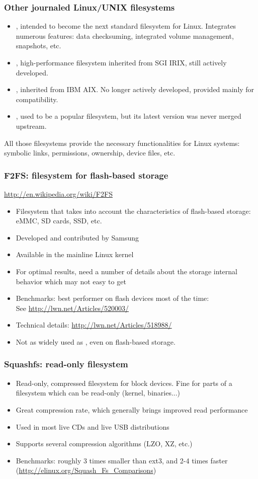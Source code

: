 \begin{frame}
  \frametitle{Other journaled Linux/UNIX filesystems}
  \begin{itemize}
  \item {}, intended to become the next standard filesystem
    for Linux. Integrates numerous features: data checksuming,
    integrated volume management, snapshots, etc.
  \item {}, high-performance filesystem inherited from SGI
    IRIX, still actively developed.
  \item {}, inherited from IBM AIX. No longer actively
    developed, provided mainly for compatibility.
  \item {}, used to be a popular filesystem, but its
    latest version  was never merged upstream.
  \end{itemize}
  All those filesystems provide the necessary functionalities for
  Linux systems: symbolic links, permissions, ownership, device files,
  etc.
\end{frame}

\begin{frame}
  \frametitle{F2FS: filesystem for flash-based storage}
  \url{http://en.wikipedia.org/wiki/F2FS}
  \begin{itemize}
  \item Filesystem that takes into account the characteristics of
    flash-based storage: eMMC, SD cards, SSD, etc.
  \item Developed and contributed by Samsung
  \item Available in the mainline Linux kernel
  \item For optimal results, need a number of details about the
    storage internal behavior which may not easy to get
  \item Benchmarks: best performer on flash devices most of the time: \\
        See \url{http://lwn.net/Articles/520003/}
  \item Technical details: \url{http://lwn.net/Articles/518988/}
  \item Not as widely used as , even on flash-based
    storage.
  \end{itemize}
\end{frame}

\begin{frame}
  \frametitle{Squashfs: read-only filesystem}
  \begin{itemize}
  \item Read-only, compressed filesystem for block devices. Fine for
    parts of a filesystem which can be read-only (kernel, binaries...)
  \item Great compression rate, which generally brings improved read
    performance
  \item Used in most live CDs and live USB distributions
  \item Supports several compression algorithms (LZO, XZ, etc.)
  \item Benchmarks: roughly 3 times smaller than ext3, and 2-4 times
    faster (\url{http://elinux.org/Squash_Fs_Comparisons})
  \end{itemize}
\end{frame}


